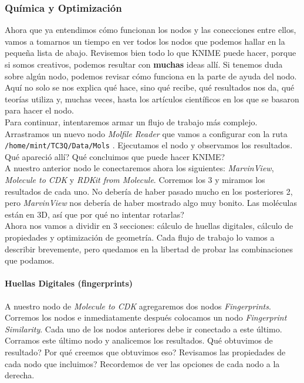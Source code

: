 \documentclass[10pt,letterpaper]{article}
\newcommand{\inlinecode}[1]{
\colorbox{light-gray}{\texttt{#1}}
}
\begin{document}
\subsubsection{Qu\'imica y Optimizaci\'on}
Ahora que ya entendimos c\'omo funcionan los nodos y las conecciones entre ellos, vamos a tomarnos un tiempo en ver todos los nodos que podemos hallar en la peque\~na lista de abajo. Revisemos bien todo lo que KNIME puede hacer, porque si somos creativos, podemos resultar con \textbf{muchas} ideas all\'i. Si tenemos duda sobre alg\'un nodo, podemos revisar c\'omo funciona en la parte de ayuda del nodo. Aqu\'i no solo se nos explica qu\'e hace, sino qu\'e recibe, qu\'e resultados nos da, qu\'e teor\'ias utiliza y, muchas veces, hasta los art\'iculos cient\'ificos en los que se basaron para hacer el nodo.\\

Para continuar, intentaremos armar un flujo de trabajo m\'as complejo. Arrastramos un nuevo nodo \emph{Molfile Reader} que vamos a configurar con la ruta \inlinecode{/home/mint/TC3Q/Data/Mols}. Ejecutamos el nodo y observamos los resultados. Qu\'e apareci\'o all\'i? Qu\'e concluimos que puede hacer KNIME?\\

A nuestro anterior nodo le conectaremos ahora los siguientes: \emph{MarvinView}, \emph{Molecule to CDK} y \emph{RDKit from Molecule}. Corremos los 3 y miramos los resultados de cada uno. No deber\'ia de haber pasado mucho en los posteriores 2, pero \emph{MarvinView} nos deber\'ia de haber mostrado algo muy bonito. Las mol\'eculas est\'an en 3D, as\'i que por qu\'e no intentar rotarlas?\\

Ahora nos vamos a dividir en 3 secciones: c\'alculo de huellas digitales, c\'alculo de propiedades y optimizaci\'on de geometr\'ia. Cada flujo de trabajo lo vamos a describir brevemente, pero quedamos en la libertad de probar las combinaciones que podamos.\\

\paragraph{Huellas Digitales (fingerprints)}
A nuestro nodo de \emph{Molecule to CDK} agregaremos dos nodos \emph{Fingerprints}. Corremos los nodos e inmediatamente despu\'es colocamos un nodo \emph{Fingerprint Similarity}. Cada uno de los nodos anteriores debe ir conectado a este \'ultimo. Corramos este \'ultimo nodo y analicemos los resultados. Qu\'e obtuvimos de resultado? Por qu\'e creemos que obtuvimos eso? Revisamos las propiedades de cada nodo que incluimos? Recordemos de ver las opciones de cada nodo a la derecha.
\end{document}
